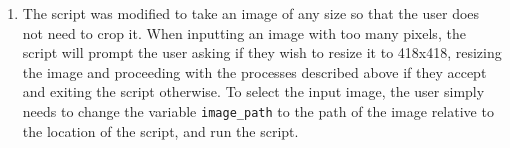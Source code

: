 \begin{enumerate}[wide, label=(B\arabic*)]
\item
The script was modified to take an image of any size so that the user does not need to crop it. When inputting an image with too many pixels, the script will prompt the user asking if they wish to resize it to 418x418, resizing the image and proceeding with the processes described above if they accept and exiting the script otherwise. To select the input image, the user simply needs to change the variable \texttt{image\_path} to the path of the image relative to the location of the script, and run the script.

\end{enumerate}